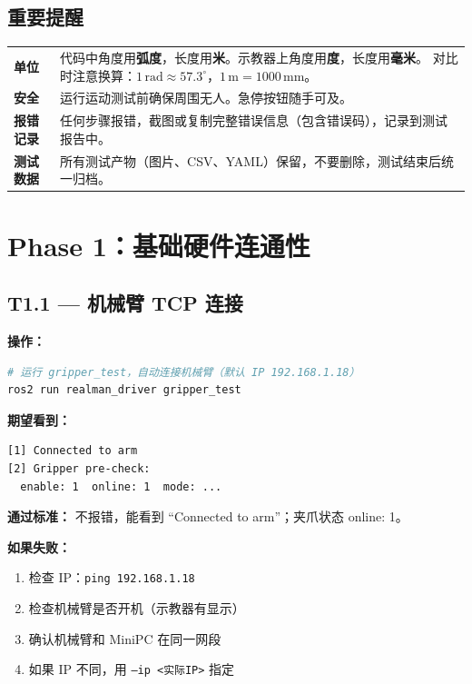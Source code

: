 \documentclass[12pt,a4paper,fontset=ubuntu]{ctexart}
\newcommand{\passcriteria}[1]{%
  \textbf{通过标准：} #1%
}
\begin{document}
\subsection{重要提醒}

\begin{center}
\begin{tabularx}{\textwidth}{@{}>{\bfseries}lX@{}}
  \toprule
  单位 & 代码中角度用\textbf{弧度}，长度用\textbf{米}。示教器上角度用\textbf{度}，长度用\textbf{毫米}。
        对比时注意换算：$1\,\text{rad} \approx 57.3^\circ$，$1\,\text{m} = 1000\,\text{mm}$。\\[4pt]
  安全 & 运行运动测试前确保周围无人。急停按钮随手可及。\\[4pt]
  报错记录 & 任何步骤报错，截图或复制完整错误信息（包含错误码），记录到测试报告中。\\[4pt]
  测试数据 & 所有测试产物（图片、CSV、YAML）保留，不要删除，测试结束后统一归档。\\
  \bottomrule
\end{tabularx}
\end{center}

\section{Phase 1：基础硬件连通性}

\subsection{T1.1 — 机械臂 TCP 连接}

\textbf{操作：}

\begin{lstlisting}[language=bash]
# 运行 gripper_test，自动连接机械臂（默认 IP 192.168.1.18）
ros2 run realman_driver gripper_test
\end{lstlisting}

\textbf{期望看到：}

\begin{lstlisting}[]
[1] Connected to arm
[2] Gripper pre-check:
  enable: 1  online: 1  mode: ...
\end{lstlisting}

\passcriteria{
  不报错，能看到 ``Connected to arm''；夹爪状态 online: 1。
}

\begin{warnbox}
\textbf{如果失败：}
\begin{enumerate}[nosep]
  \item 检查 IP：\texttt{ping 192.168.1.18}
  \item 检查机械臂是否开机（示教器有显示）
  \item 确认机械臂和 MiniPC 在同一网段
  \item 如果 IP 不同，用 \texttt{--ip <实际IP>} 指定
\end{enumerate}
\end{warnbox}
\end{document}
